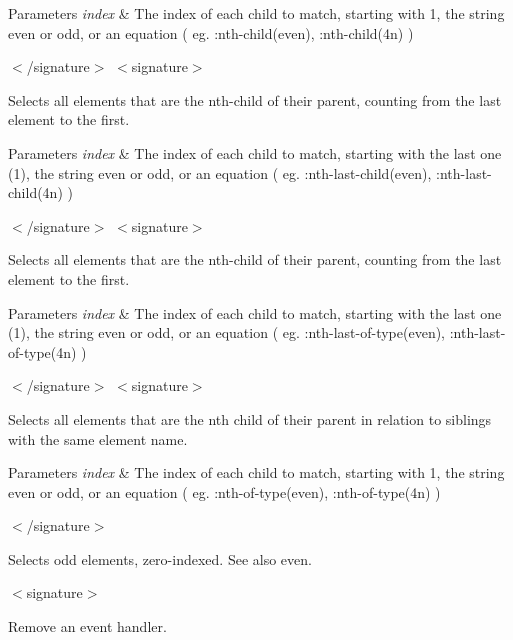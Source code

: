 \begin{DoxyParams}{Parameters}
{\em index} & The index of each child to match, starting with 1, the string even or odd, or an equation ( eg. \-:nth-\/child(even), \-:nth-\/child(4n) )\\
\hline
\end{DoxyParams}
$<$/signature$>$ $<$signature$>$ 

Selects all elements that are the nth-\/child of their parent, counting from the last element to the first.


\begin{DoxyParams}{Parameters}
{\em index} & The index of each child to match, starting with the last one (1), the string even or odd, or an equation ( eg. \-:nth-\/last-\/child(even), \-:nth-\/last-\/child(4n) )\\
\hline
\end{DoxyParams}
$<$/signature$>$ $<$signature$>$ 

Selects all elements that are the nth-\/child of their parent, counting from the last element to the first.


\begin{DoxyParams}{Parameters}
{\em index} & The index of each child to match, starting with the last one (1), the string even or odd, or an equation ( eg. \-:nth-\/last-\/of-\/type(even), \-:nth-\/last-\/of-\/type(4n) )\\
\hline
\end{DoxyParams}
$<$/signature$>$ $<$signature$>$ 

Selects all elements that are the nth child of their parent in relation to siblings with the same element name.


\begin{DoxyParams}{Parameters}
{\em index} & The index of each child to match, starting with 1, the string even or odd, or an equation ( eg. \-:nth-\/of-\/type(even), \-:nth-\/of-\/type(4n) )\\
\hline
\end{DoxyParams}
$<$/signature$>$ 

Selects odd elements, zero-\/indexed. See also even.

$<$signature$>$ 

Remove an event handler.


